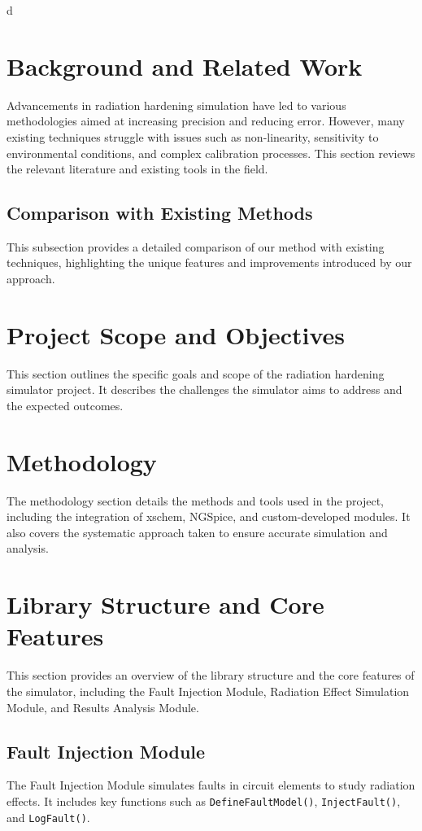 d\documentclass[conference]{IEEEtran}
\begin{document}
\section{Background and Related Work}
Advancements in radiation hardening simulation have led to various methodologies aimed at increasing precision and reducing error. However, many existing techniques struggle with issues such as non-linearity, sensitivity to environmental conditions, and complex calibration processes. This section reviews the relevant literature and existing tools in the field.

\subsection{Comparison with Existing Methods}
This subsection provides a detailed comparison of our method with existing techniques, highlighting the unique features and improvements introduced by our approach.

\section{Project Scope and Objectives}
This section outlines the specific goals and scope of the radiation hardening simulator project. It describes the challenges the simulator aims to address and the expected outcomes.

\section{Methodology}
The methodology section details the methods and tools used in the project, including the integration of xschem, NGSpice, and custom-developed modules. It also covers the systematic approach taken to ensure accurate simulation and analysis.

\section{Library Structure and Core Features}
This section provides an overview of the library structure and the core features of the simulator, including the Fault Injection Module, Radiation Effect Simulation Module, and Results Analysis Module.

\subsection{Fault Injection Module}
The Fault Injection Module simulates faults in circuit elements to study radiation effects. It includes key functions such as \texttt{DefineFaultModel()}, \texttt{InjectFault()}, and \texttt{LogFault()}.
\end{document}
